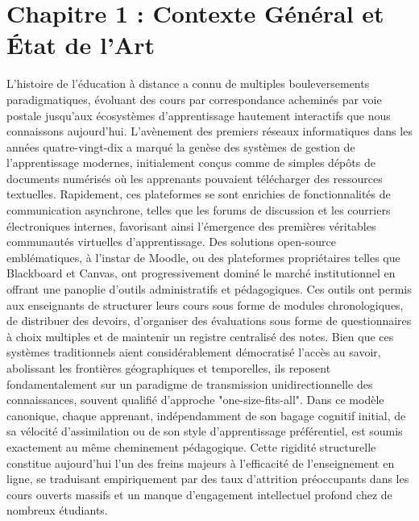 \section{Chapitre 1 : Contexte Général et État de l'Art}

L'histoire de l'éducation à distance a connu de multiples bouleversements paradigmatiques, évoluant des cours par correspondance acheminés par voie postale jusqu'aux écosystèmes d'apprentissage hautement interactifs que nous connaissons aujourd'hui. L'avènement des premiers réseaux informatiques dans les années quatre-vingt-dix a marqué la genèse des systèmes de gestion de l'apprentissage modernes, initialement conçus comme de simples dépôts de documents numérisés où les apprenants pouvaient télécharger des ressources textuelles. Rapidement, ces plateformes se sont enrichies de fonctionnalités de communication asynchrone, telles que les forums de discussion et les courriers électroniques internes, favorisant ainsi l'émergence des premières véritables communautés virtuelles d'apprentissage. Des solutions open-source emblématiques, à l'instar de Moodle, ou des plateformes propriétaires telles que Blackboard et Canvas, ont progressivement dominé le marché institutionnel en offrant une panoplie d'outils administratifs et pédagogiques. Ces outils ont permis aux enseignants de structurer leurs cours sous forme de modules chronologiques, de distribuer des devoirs, d'organiser des évaluations sous forme de questionnaires à choix multiples et de maintenir un registre centralisé des notes. Bien que ces systèmes traditionnels aient considérablement démocratisé l'accès au savoir, abolissant les frontières géographiques et temporelles, ils reposent fondamentalement sur un paradigme de transmission unidirectionnelle des connaissances, souvent qualifié d'approche "one-size-fits-all". Dans ce modèle canonique, chaque apprenant, indépendamment de son bagage cognitif initial, de sa vélocité d'assimilation ou de son style d'apprentissage préférentiel, est soumis exactement au même cheminement pédagogique. Cette rigidité structurelle constitue aujourd'hui l'un des freins majeurs à l'efficacité de l'enseignement en ligne, se traduisant empiriquement par des taux d'attrition préoccupants dans les cours ouverts massifs et un manque d'engagement intellectuel profond chez de nombreux étudiants.

